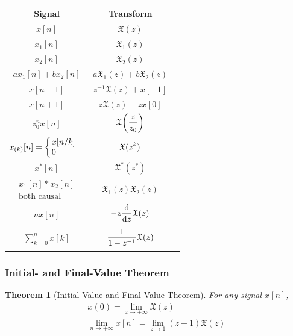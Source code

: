 \documentclass[10pt,UTF8]{article}
\makeatletter
\newenvironment{definition box}
{\begin{tcolorbox}[colback=blue!5!white,colframe=blue!75!black,parbox=false,before upper=\par,before lower=\par]}
{\end{tcolorbox}}
\newenvironment{theorem box}
{\begin{tcolorbox}[colback=yellow!5!white,colframe=yellow!75!black,parbox=false,before upper=\par,before lower=\par]}
{\end{tcolorbox}}
\theoremstyle{definition}
\newtheorem{definition inner}{Definition}[section]
\theoremstyle{plain}
\newtheorem{theorem inner}{Theorem}[section]
\newenvironment{theorem}[1][]
{\begin{theorem box}\begin{theorem inner}[#1]\hfill\par}
{\end{theorem inner}\end{theorem box}}
\theoremstyle{definition}
\newtheorem*{proof inner}{\textit{Proof}}
\theoremstyle{remark}
\newcommand{\mycases}[2][0.8]{
    \left\{\vphantom{\scalebox{#1}{
        $\begin{matrix}#2\end{matrix}$
    }}\right.\!\!\!\!
    \begin{array}{l@{\quad}l}#2\end{array}
}
\makeatother
\begin{document}
\begin{center}
\begin{tabular}
    { c @{\qquad} c @{\qquad} c}
    Signal & Transform \\
    \hline $\displaystyle
    x[n]
    $ & $\displaystyle
    \mathfrak{X}(z)
    $ \\\hline $
    x_1[n]
    $ & $\displaystyle
    \mathfrak{X}_1(z)
    $ \\\hline $
    x_2[n]
    $ & $\displaystyle
    \mathfrak{X}_2(z)
    $ \\\hline $
    a x_1[n] + b x_2[n]
    $ & $\displaystyle
    a \mathfrak{X}_1(z) + b \mathfrak{X}_2(z)
    $ \\\hline $
    x[n-1]
    $ & $\displaystyle
    z^{-1} \mathfrak{X}(z) + x[-1]
    $ \\\hline $\displaystyle
    x[n+1]
    $ & $\displaystyle
    z \mathfrak{X}(z) - z x[0]
    $ \\\hline $\displaystyle
    z_0^n x[n]
    $ & $\displaystyle
    \mathfrak{X}\qty(\frac{z}{z_0}) \vphantom{\mycases{1\\1}}
    $ \\\hline $\displaystyle
    x_{(k)}[n] = \mycases{
        x[n/k] \\ 0
    }
    $ & $\displaystyle
    \mathfrak{X}(z^k) \vphantom{\mycases{1\\1}}
    $ \\\hline $
    x^*[n]
    $ & $\displaystyle
    \mathfrak{X}^*(z^*)
    $ \\\hline $
    \begin{matrix}
        x_1[n] \ast x_2[n] \\
        \text{both causal}
    \end{matrix}
    $ & $\displaystyle
    \mathfrak{X}_1(z) \mathfrak{X}_2(z)
    $ \\\hline $\displaystyle
    n x[n]
    $ & $\displaystyle
    -z \dv{z} \mathfrak{X}(z) \vphantom{\mycases{1\\1}}
    $ \\\hline $\displaystyle
    \sum_{k=0}^{n} x[k]
    $ & $\displaystyle
    \frac{1}{1-z^{-1}} \mathfrak{X}(z) \vphantom{\mycases{1\\1}}
    $ \\\hline
\end{tabular}
\end{center}

\subsubsection{Initial- and Final-Value Theorem}
\begin{theorem}[Initial-Value and Final-Value Theorem]
    For any signal $x[n]$,
    \begin{gather*}
        x(0) = \lim_{z\to+\infty} \mathfrak{X}(z) \\
        \lim_{n\to+\infty} x[n] = \lim_{z\to 1} (z-1) \mathfrak{X}(z)
    \end{gather*}
\end{theorem}
\end{document}
